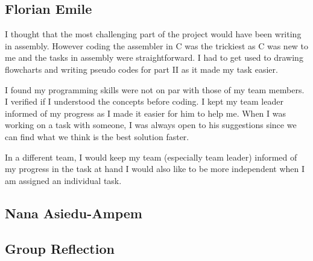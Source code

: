 \documentclass[11pt]{article}
\begin{document}
\subsection{Florian Emile}
I thought that the most challenging part of the project would have been writing
in assembly. However coding the assembler in C was the trickiest as C was new to
me and the tasks in assembly were straightforward. I had to get used to drawing
flowcharts and writing pseudo codes for part II as it made my task easier.

I found my programming skills were not on par with those of my team members. I
verified if I understood the concepts before coding. I kept my team leader
informed of my progress as I made it easier for him to help me. When I was
working on a task with someone, I was always open to his suggestions since we
can find what we think is the best solution faster.

In a different team, I would keep my team (especially team leader) informed of
my progress in the task at hand I would also like to be more independent when I
am assigned an individual task.

\subsection{Nana Asiedu-Ampem}
\subsection{Group Reflection}
\end{document}
